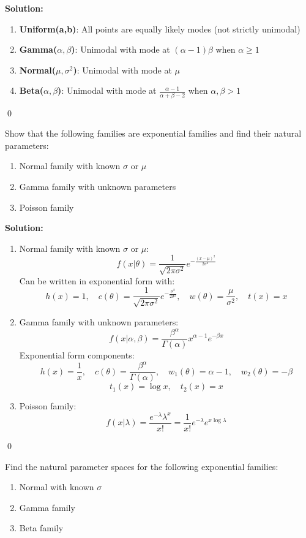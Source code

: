 \noindent\textbf{Solution:}
\begin{enumerate}[label=(\alph*)]
\item \textbf{Uniform(a,b)}: All points are equally likely modes (not strictly unimodal)
\item \textbf{Gamma($\alpha,\beta$)}: Unimodal with mode at $(\alpha-1)\beta$ when $\alpha \geq 1$
\item \textbf{Normal($\mu,\sigma^2$)}: Unimodal with mode at $\mu$
\item \textbf{Beta($\alpha,\beta$)}: Unimodal with mode at $\frac{\alpha-1}{\alpha+\beta-2}$ when $\alpha,\beta > 1$
\end{enumerate}


\qed
\begin{problembox}
Show that the following families are exponential families and find their natural parameters:
\begin{enumerate}[label=(\alph*)]
\item Normal family with known $\sigma$ or $\mu$
\item Gamma family with unknown parameters
\item Poisson family
\end{enumerate}
\end{problembox}

\noindent\textbf{Solution:}
\begin{enumerate}[label=(\alph*)]
\item Normal family with known $\sigma$ or $\mu$:
\[ f(x|\theta) = \frac{1}{\sqrt{2\pi\sigma^2}}e^{-\frac{(x-\mu)^2}{2\sigma^2}} \]
Can be written in exponential form with:
\[ h(x) = 1, \quad c(\theta) = \frac{1}{\sqrt{2\pi\sigma^2}}e^{-\frac{\mu^2}{2\sigma^2}}, \quad w(\theta) = \frac{\mu}{\sigma^2}, \quad t(x) = x \]

\item Gamma family with unknown parameters:
\[ f(x|\alpha,\beta) = \frac{\beta^\alpha}{\Gamma(\alpha)}x^{\alpha-1}e^{-\beta x} \]
Exponential form components:
\[ h(x) = \frac{1}{x}, \quad c(\theta) = \frac{\beta^\alpha}{\Gamma(\alpha)}, \quad w_1(\theta) = \alpha-1, \quad w_2(\theta) = -\beta \]
\[ t_1(x) = \log x, \quad t_2(x) = x \]

\item Poisson family:
\[ f(x|\lambda) = \frac{e^{-\lambda}\lambda^x}{x!} = \frac{1}{x!}e^{-\lambda}e^{x\log\lambda} \]
\end{enumerate}


\qed
\begin{problembox}
Find the natural parameter spaces for the following exponential families:
\begin{enumerate}[label=(\alph*)]
\item Normal with known $\sigma$
\item Gamma family
\item Beta family
\end{enumerate}
\end{problembox}

